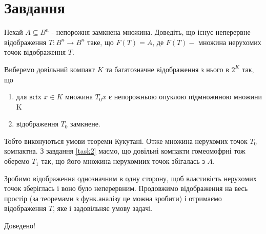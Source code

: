 
\chapter{Завдання \theHchapter}

\begin{tcolorbox}[title=Завдання]
    Нехай $A \subseteq B^{n}$ - непорожня замкнена множина. 
    Доведіть, що існує неперервне відображення 
    $T: B^{n} \rightarrow B^{n}$ таке, що $F(T)=A$, 
    де $F(T)-$ множина нерухомих точок відображення $T$.
\end{tcolorbox}



Виберемо довільний компакт $K$ та багатозначне 
відображення з нього в $2^K$ так, що

\begin{enumerate}
    \item для всiх $x \in K$ множина $T_0x$ є непорожньою
        опуклою пiдмножиною множини K

    
    \item вiдображення $T_0$ замкнене.
\end{enumerate}

Тобто виконуються умови теореми Кукутані. Отже множина нерухомих точок 
$T_0$ компактна. З завдання \ref{task2} маємо, що довільні компакти 
гомеомофрні тож оберемо $T_1$ так, що його множина нерухомиих точок 
збігалась з $A$. 


Зробимо відображення однозначним в одну сторону, щоб властивість нерухомих 
точок зберіглась і воно було неперервним. Продовжимо відображення на весь 
простір (за теоремами з функ.аналізу це можна зробити) і отримаємо 
відображення $T$, яке і задовільняє умову задачі.


Доведено!